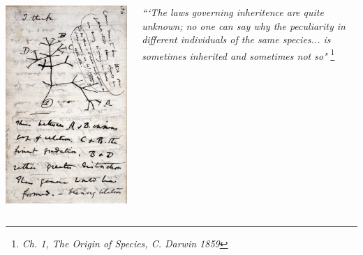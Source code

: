 \documentclass{beamer}
\begin{document}
\begin{frame}
	\begin{columns}
		\begin{column}{0.4\textwidth}
			\includegraphics[keepaspectratio, width  = \textwidth]{img/iThnk} \pause
		\end{column}
		\begin{column}{0.5\textwidth}
	\small
	\textit{```The laws governing inheritence are quite unknown; no one can say why the peculiarity in different individuals of the same species... is sometimes inherited and sometimes not so"} \footnote[1]{\textit{Ch. 1, The Origin of Species, C. Darwin 1859}} \pause
	
	\vspace{10pt}
	

\end{column}
\end{columns}
\end{frame}
\end{document}
